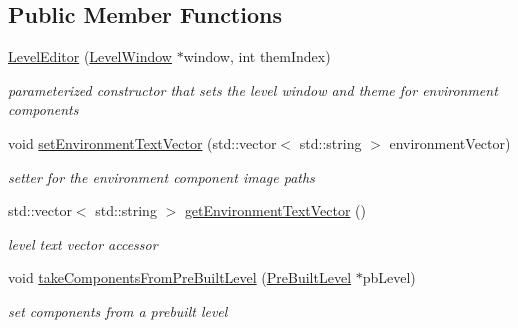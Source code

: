 \subsection*{Public Member Functions}
\begin{DoxyCompactItemize}
\item 
\hypertarget{class_level_editor_a39c09a83873a4f53eef70cd65ff8eb6c}{}\label{class_level_editor_a39c09a83873a4f53eef70cd65ff8eb6c} 
\hyperlink{class_level_editor_a39c09a83873a4f53eef70cd65ff8eb6c}{Level\+Editor} (\hyperlink{class_level_window}{Level\+Window} $\ast$window, int them\+Index)
\begin{DoxyCompactList}\small\item\em parameterized constructor that sets the level window and theme for environment components \end{DoxyCompactList}\item 
\hypertarget{class_level_editor_ac8af038d8ef0461ce1988ac7fec6f17c}{}\label{class_level_editor_ac8af038d8ef0461ce1988ac7fec6f17c} 
void \hyperlink{class_level_editor_ac8af038d8ef0461ce1988ac7fec6f17c}{set\+Environment\+Text\+Vector} (std\+::vector$<$ std\+::string $>$ environment\+Vector)
\begin{DoxyCompactList}\small\item\em setter for the environment component image paths \end{DoxyCompactList}\item 
\hypertarget{class_level_editor_abe7384b7c3b36b0488353635062a90bd}{}\label{class_level_editor_abe7384b7c3b36b0488353635062a90bd} 
std\+::vector$<$ std\+::string $>$ \hyperlink{class_level_editor_abe7384b7c3b36b0488353635062a90bd}{get\+Environment\+Text\+Vector} ()
\begin{DoxyCompactList}\small\item\em level text vector accessor \end{DoxyCompactList}\item 
\hypertarget{class_level_editor_a1a656c098a5bae50f42fccf4f67269ae}{}\label{class_level_editor_a1a656c098a5bae50f42fccf4f67269ae} 
void \hyperlink{class_level_editor_a1a656c098a5bae50f42fccf4f67269ae}{take\+Components\+From\+Pre\+Built\+Level} (\hyperlink{class_pre_built_level}{Pre\+Built\+Level} $\ast$pb\+Level)
\begin{DoxyCompactList}\small\item\em set components from a prebuilt level \end{DoxyCompactList}\item 
\hypertarget{class_level_editor_af66c9cfd7e8c2da4d1d041e74cf07efa}{}\label{class_level_editor_af66c9cfd7e8c2da4d1d041e74cf07efa} 

\end{DoxyCompactItemize}
